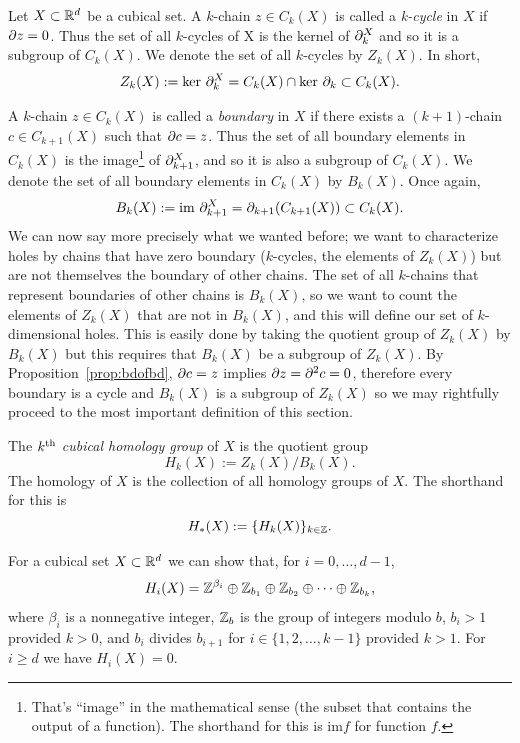 \begin{defn}
	Let $X \subset \mathbb{R}^d$ be a cubical set. A $k$-chain $z \in C_k(X)$ is called a \textit{k-cycle} in $X$ if $\partial z = 0$. Thus the set of all $k$-cycles of X is the kernel of $\partial_k^X$ and so it is a subgroup of $C_k(X)$. We denote the set of all $k$-cycles by $Z_k(X)$. In short,
	\begin{align}
		Z_k(X) := \text{ker } \partial_k^X = C_k(X) \cap \text{ker } \partial_k \subset C_k(X).
	\end{align}
\end{defn}

%
A $k$-chain $z \in C_k(X)$ is called a \textit{boundary} in $X$ if there exists a $(k+1)$-chain $c \in C_{k+1}(X)$ such that $\partial c = z$. Thus the set of all boundary elements in $C_k(X)$ is the image\footnote{That's ``image'' in the mathematical sense (\ie the subset that contains the output of a function). The shorthand for this is $\text{im} f$ for function $f$.} of $\partial_{k+1}^X$, and so it is also a subgroup of $C_k(X)$. We denote the set of all boundary elements in $C_k(X)$ by $B_k(X)$. Once again,
%
\begin{align}
	B_k(X) := \text{im } \partial_{k+1}^X = \partial_{k+1} (C_{k+1}(X)) \subset C_k(X).
\end{align}
%
We can now say more precisely what we wanted before; we want to characterize holes by chains that have zero boundary (\ie $k$-cycles, the elements of $Z_k(X)$) but are not themselves the boundary of other chains. The set of all $k$-chains that represent boundaries of other chains is $B_k(X)$, so we want to count the elements of $Z_k(X)$ that are not in $B_k(X)$, and this will define our set of $k$-dimensional holes. This  is easily done by taking the quotient group of $Z_k(X)$ by $B_k(X)$ but this requires that $B_k(X)$ be a subgroup of $Z_k(X)$. By Proposition~\ref{prop:bdofbd}, $\partial c = z$ implies $\partial z = \partial^2 c = 0$, therefore every boundary is a cycle and $B_k(X)$ is a subgroup of $Z_k(X)$ so we may rightfully proceed to the most important definition of this section.

\begin{defn}
	The $k\textsuperscript{th}$ \textit{cubical homology group} of $X$ is the quotient group
	$$ H_k(X) := Z_k(X) / B_k(X). $$
	The homology of $X$ is the collection of all homology groups of $X$. The shorthand for this is
	$$ H_{*}(X) := \{ H_k(X) \}_{k \in \mathbb{Z}} .$$
\end{defn}

For a cubical set $X \subset \mathbb{R}^d$ we can show that, for $i = 0, \ldots, d-1$, 
$$H_i(X) = \mathbb{Z}^{\beta_i} \oplus \mathbb{Z}_{b_1} \oplus \mathbb{Z}_{b_2} \oplus \cdots \oplus \mathbb{Z}_{b_k},$$ 
where $\beta_i$ is a nonnegative integer, $\mathbb{Z}_b$ is the group of integers modulo $b$, $b_i > 1$ provided $k > 0$, and $b_i$ divides $b_{i+1}$ for $i \in \{ 1, 2, \ldots, k-1 \}$ provided $k > 1$. For $ i \geq d$ we have $H_i(X) = 0$.

